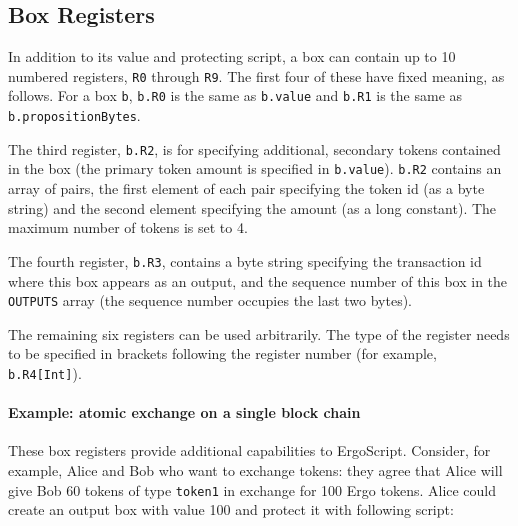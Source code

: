 \documentclass[11pt]{article}
\newcommand{\authnote}[2]{\marginpar{\parbox{\marginparwidth}{\tiny %
  \textsf{#1 {\textcolor{blue}{notes: #2}}}}}%
  \textcolor{blue}{\textbf{\dag}}}
\newcommand{\authnote}[2]{
  \textsf{#1 \textcolor{blue}{: #2}}}
\newcommand{\authnote}[2]{}
\newcommand{\lnote}[1]{{\authnote{\textcolor{orange}{Leo notes}}{#1}}}
\newcommand{\mnote}[1]{{\authnote{\textcolor{red}{Morphic}}{#1}}}
\newcommand{\dnote}[1]{{\authnote{\textcolor{brown}{Dima notes}}{#1}}}
\newcommand{\langname}{ErgoScript\xspace}
\begin{document}
\subsection{Box Registers}
\dnote{I propose to move this section much earlier, close to box definition in the beggining of section 3}
In addition to its value and protecting script, a box can contain up to 10 numbered registers, \texttt{R0} through \texttt{R9}. The first four of these have fixed meaning, as follows. For a box \texttt{b}, \texttt{b.R0} is the same as \texttt{b.value} and \texttt{b.R1} is the same as \texttt{b.propositionBytes}. 
\lnote{check}

The third register, \texttt{b.R2}, is for specifying additional, secondary tokens contained in the box (the primary token amount is specified in \texttt{b.value}). \texttt{b.R2} contains an array of pairs, the first element of each pair specifying the token id (as a byte string) and the second element specifying the amount (as a long constant). The maximum number of tokens is set to 4. 
\lnote{check}

The fourth register, \texttt{b.R3}, contains a byte string specifying the transaction id where this box appears as an output, and the sequence number of this box in the \texttt{OUTPUTS} array (the sequence number occupies the last two bytes).
\lnote{check and clarify the format of transaction id}

The remaining six registers can be used arbitrarily. The type of the register needs to be specified in brackets following the register number (for example, \texttt{b.R4[Int]}). 
\lnote{check}

\lnote{What's box.bytes and box.byteWithNoRef? are they available to a script?}

\mnote{box.bytes are available and equivalent to serialization of all Box data.
box.byteWithNoRef is also available and equivalent to ErgoBoxCandidate serialization which doesn't include transactionId and index of the Box.}

\paragraph{Example: atomic exchange on a single block chain}
These box registers provide additional capabilities to \langname. Consider, for example, Alice and Bob who want to exchange tokens: they agree that  Alice will give Bob 60 tokens of type \texttt{token1} in exchange for 100 Ergo tokens. Alice could create an output box with value 100 and protect it with following script:
\end{document}
